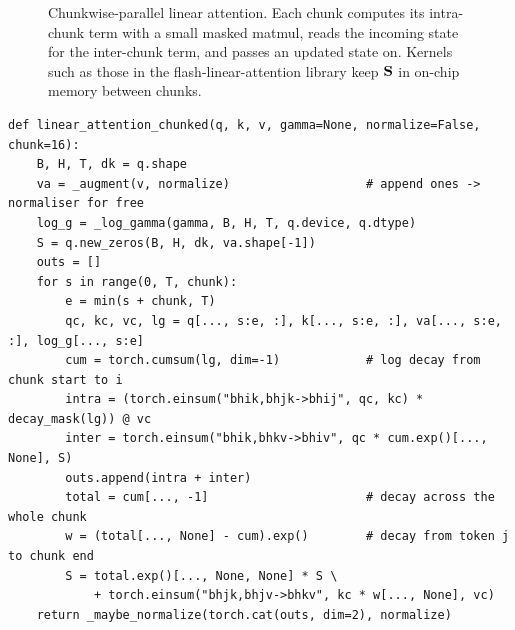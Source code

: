 \begin{figure}[t]
\centering
{}
\caption{Chunkwise-parallel linear attention. Each chunk computes its intra-chunk term with a small
masked matmul, reads the incoming state for the inter-chunk term, and passes an updated state on.
Kernels such as those in the flash-linear-attention library keep $\mathbf{S}$ in on-chip memory between chunks.}
\label{fig:attnalt:chunk}
\end{figure}

\begin{lstlisting}[caption={Chunkwise linear attention with optional decay (\texttt{llmsys/linear\_attn.py}).},label={lst:attnalt:chunked}]
def linear_attention_chunked(q, k, v, gamma=None, normalize=False, chunk=16):
    B, H, T, dk = q.shape
    va = _augment(v, normalize)                   # append ones -> normaliser for free
    log_g = _log_gamma(gamma, B, H, T, q.device, q.dtype)
    S = q.new_zeros(B, H, dk, va.shape[-1])
    outs = []
    for s in range(0, T, chunk):
        e = min(s + chunk, T)
        qc, kc, vc, lg = q[..., s:e, :], k[..., s:e, :], va[..., s:e, :], log_g[..., s:e]
        cum = torch.cumsum(lg, dim=-1)            # log decay from chunk start to i
        intra = (torch.einsum("bhik,bhjk->bhij", qc, kc) * decay_mask(lg)) @ vc
        inter = torch.einsum("bhik,bhkv->bhiv", qc * cum.exp()[..., None], S)
        outs.append(intra + inter)
        total = cum[..., -1]                      # decay across the whole chunk
        w = (total[..., None] - cum).exp()        # decay from token j to chunk end
        S = total.exp()[..., None, None] * S \
            + torch.einsum("bhjk,bhjv->bhkv", kc * w[..., None], vc)
    return _maybe_normalize(torch.cat(outs, dim=2), normalize)
\end{lstlisting}

